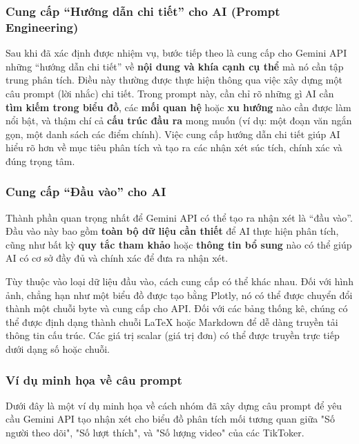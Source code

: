 \subsubsection{Cung cấp ``Hướng dẫn chi tiết'' cho AI (Prompt Engineering)}

Sau khi đã xác định được nhiệm vụ, bước tiếp theo là cung cấp cho Gemini API những ``hướng dẫn chi tiết'' về \textbf{nội dung và khía cạnh cụ thể} mà nó cần tập trung phân tích. Điều này thường được thực hiện thông qua việc xây dựng một câu prompt (lời nhắc) chi tiết. Trong prompt này, cần chỉ rõ những gì AI cần \textbf{tìm kiếm trong biểu đồ}, các \textbf{mối quan hệ} hoặc \textbf{xu hướng} nào cần được làm nổi bật, và thậm chí cả \textbf{cấu trúc đầu ra} mong muốn (ví dụ: một đoạn văn ngắn gọn, một danh sách các điểm chính). Việc cung cấp hướng dẫn chi tiết giúp AI hiểu rõ hơn về mục tiêu phân tích và tạo ra các nhận xét súc tích, chính xác và đúng trọng tâm.

\subsubsection{Cung cấp ``Đầu vào'' cho AI}

Thành phần quan trọng nhất để Gemini API có thể tạo ra nhận xét là ``đầu vào''. Đầu vào này bao gồm \textbf{toàn bộ dữ liệu cần thiết} để AI thực hiện phân tích, cũng như bất kỳ \textbf{quy tắc tham khảo} hoặc \textbf{thông tin bổ sung} nào có thể giúp AI có cơ sở đầy đủ và chính xác để đưa ra nhận xét.

Tùy thuộc vào loại dữ liệu đầu vào, cách cung cấp có thể khác nhau. Đối với hình ảnh, chẳng hạn như một biểu đồ được tạo bằng Plotly, nó có thể được chuyển đổi thành một chuỗi byte và cung cấp cho API. Đối với các bảng thống kê, chúng có thể được định dạng thành chuỗi LaTeX hoặc Markdown để dễ dàng truyền tải thông tin cấu trúc. Các giá trị scalar (giá trị đơn) có thể được truyền trực tiếp dưới dạng số hoặc chuỗi.

\subsubsection{Ví dụ minh họa về câu prompt}

Dưới đây là một ví dụ minh họa về cách nhóm đã xây dựng câu prompt để yêu cầu Gemini API tạo nhận xét cho biểu đồ phân tích mối tương quan giữa "Số người theo dõi", "Số lượt thích", và "Số lượng video" của các TikToker.

